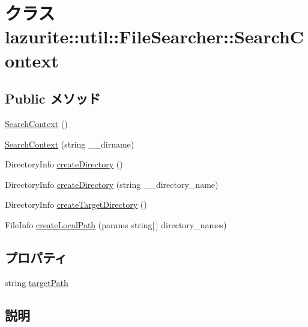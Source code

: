 \hypertarget{classlazurite_1_1util_1_1_file_searcher_1_1_search_context}{
\section{クラス lazurite::util::FileSearcher::SearchContext}
\label{classlazurite_1_1util_1_1_file_searcher_1_1_search_context}
}
\subsection*{Public メソッド}
\begin{DoxyCompactItemize}
\item 
\hyperlink{classlazurite_1_1util_1_1_file_searcher_1_1_search_context_a5a90c80e8b4e542a1ef42f04eb9fcbc2}{SearchContext} ()
\item 
\hyperlink{classlazurite_1_1util_1_1_file_searcher_1_1_search_context_a41285ae06cde6bea5e886ad2a54d4b24}{SearchContext} (string \_\-\_\-dirname)
\item 
DirectoryInfo \hyperlink{classlazurite_1_1util_1_1_file_searcher_1_1_search_context_aefc87e869317b4b994e18d1ba75c9839}{createDirectory} ()
\item 
DirectoryInfo \hyperlink{classlazurite_1_1util_1_1_file_searcher_1_1_search_context_afd039a9d56941fe74be508a1b632affb}{createDirectory} (string \_\-\_\-directory\_\-name)
\item 
DirectoryInfo \hyperlink{classlazurite_1_1util_1_1_file_searcher_1_1_search_context_a5582c83de74c7c4b8fbe6723d65e5aec}{createTargetDirectory} ()
\item 
FileInfo \hyperlink{classlazurite_1_1util_1_1_file_searcher_1_1_search_context_ae7e7380a0004bb7e1d68b6b71531c64c}{createLocalPath} (params string\mbox{[}$\,$\mbox{]} directory\_\-names)
\end{DoxyCompactItemize}
\subsection*{プロパティ}
\begin{DoxyCompactItemize}
\item 
string \hyperlink{classlazurite_1_1util_1_1_file_searcher_1_1_search_context_a2c040084d8fb7be87c9e4c0ada56c904}{targetPath}
\end{DoxyCompactItemize}


\subsection{説明}


